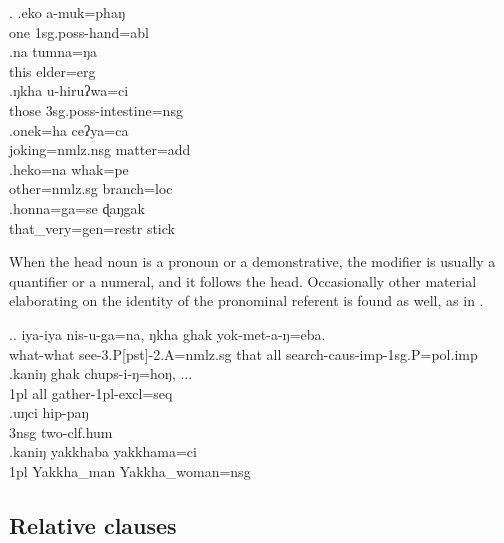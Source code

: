 \ex. \ag.eko a-muk=phaŋ\\
one {\sc 1sg.poss-}hand{\sc =abl}\\
 
\bg.na    tumna=ŋa\\
this elder{\sc =erg}\\
 
\bg.ŋkha u-hiruʔwa=ci\\
those {\sc 3sg.poss-}intestine{\sc =nsg}\\
 
\bg.onek=ha      ceʔya=ca\\
joking{\sc =nmlz.nsg} matter{\sc =add}\\
 
\bg.heko=na         whak=pe\\
other{\sc =nmlz.sg} branch{\sc =loc}\\
 
\bg.honna=ga=se                          ɖaŋgak\\
that\_very{\sc =gen=restr} stick\\
 


When the head noun is a pronoun or  a demonstrative, the modifier is usually a quantifier or a numeral, and it follows the head. Occasionally other material elaborating on the identity of the pronominal referent is found as well, as in \Next[d].\largerpage

\ex.\label{iyaiyadem}\ag.    iya-iya                nis-u-ga=na, ŋkha ghak yok-met-a-ŋ=eba.\\
what-what see{\sc -3.P[pst]-2.A=nmlz.sg} that all search{\sc -caus-imp-1sg.P=pol.imp}\\
 
\bg.kaniŋ ghak chups-i-ŋ=hoŋ, ...\\
{\sc 1pl} all gather{\sc -1pl-excl=seq}\\
 
\bg.uŋci hip-paŋ\\
{\sc 3nsg} two{\sc -clf.hum}\\
\bg.kaniŋ yakkhaba yakkhama=ci\\
{\sc 1pl} Yakkha\_man Yakkha\_woman{\sc =nsg}\\
              
			  
\subsection{Relative clauses}\label{str-np-rc}

